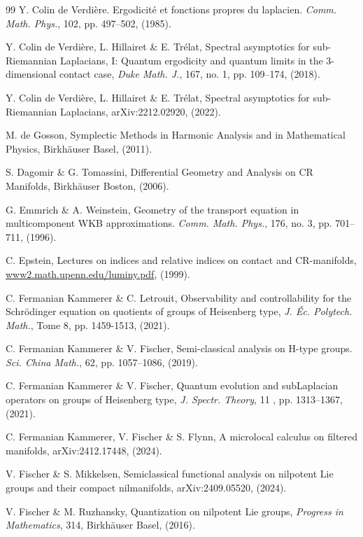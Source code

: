 \documentclass[12pt,a4paper]{amsart}
\theoremstyle{plain}
\theoremstyle{definition}
\theoremstyle{remark}
\numberwithin{equation}{section}
\theoremstyle{definition}
\numberwithin{equation}{section}
\begin{document}
\begin{thebibliography}{99}
 Y. Colin de Verdière. Ergodicité et fonctions propres du laplacien. {\it Comm. Math. Phys.}, 102, pp. 497–502, (1985).

 Y. Colin de Verdière, L. Hillairet \& E. Trélat, Spectral asymptotics for sub-Riemannian Laplacians, I: Quantum ergodicity and quantum limits in the 3-dimensional contact case, {\it Duke Math. J.}, 167, no. 1, pp. 109–174, (2018).

 Y. Colin de Verdière, L. Hillairet \& E. Trélat, Spectral asymptotics for sub-Riemannian Laplacians, arXiv:2212.02920, (2022).

 M. de Gosson, Symplectic Methods in Harmonic Analysis and in Mathematical Physics, Birkhäuser Basel, (2011).

 S. Dagomir \& G. Tomassini, {Differential Geometry and Analysis on CR Manifolds}, Birkhäuser Boston, (2006).

 G. Emmrich \& A. Weinstein, Geometry of the transport equation in multicomponent WKB approximations. {\it Comm. Math. Phys.}, 176, no. 3, pp. 701–711, (1996).

 C. Epstein, Lectures on indices and relative indices on contact and CR-manifolds, \href{https://www2.math.upenn.edu/~cle/papers/luminy.pdf}{www2.math.upenn.edu/luminy.pdf}, (1999).

 C. Fermanian Kammerer \& C. Letrouit, Observability and controllability for the Schrödinger equation on quotients of groups of Heisenberg type, {\it J. Éc. Polytech. Math.}, Tome 8, pp. 1459-1513, (2021).

 C. Fermanian Kammerer \& V. Fischer, Semi-classical analysis on H-type groups. {\it Sci. China Math.}, 62, pp. 1057–1086, (2019).

 C. Fermanian Kammerer \& V. Fischer, Quantum evolution and subLaplacian operators on groups of Heisenberg type, {\it J. Spectr. Theory}, 11 , pp. 1313–1367, (2021).

 C. Fermanian Kammerer, V. Fischer \& S. Flynn, A microlocal calculus on filtered manifolds, arXiv:2412.17448, (2024).

 V. Fischer \& S. Mikkelsen, Semiclassical functional analysis on nilpotent Lie groups and their compact nilmanifolds, arXiv:2409.05520, (2024).

 V. Fischer \& M. Ruzhansky, Quantization on nilpotent Lie groups, {\it Progress in Mathematics}, 314, Birkh\"auser Basel, (2016).


\end{thebibliography}
\end{document}
